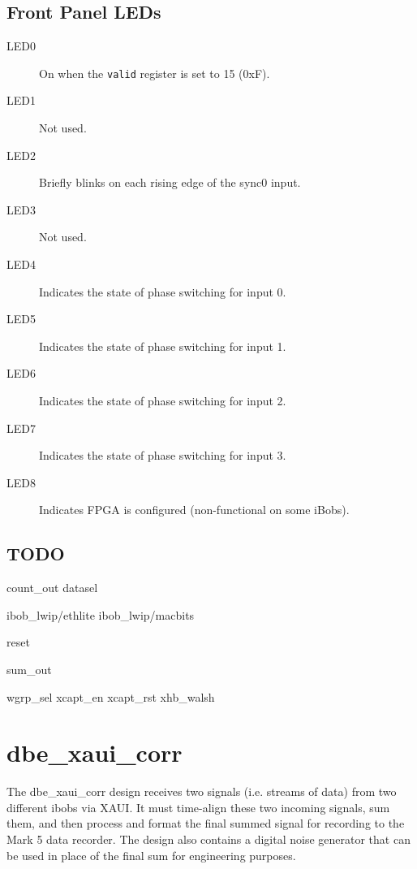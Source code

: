 \documentclass[12pt]{article}
\begin{document}
  \subsection{Front Panel LEDs}
\begin{description}
\item[LED0] On when the \verb|valid| register is set to 15 (0xF).
\item[LED1] Not used.
\item[LED2] Briefly blinks on each rising edge of the sync0 input.
\item[LED3] Not used.
\item[LED4] Indicates the state of  phase switching for input 0.
\item[LED5] Indicates the state of  phase switching for input 1.
\item[LED6] Indicates the state of  phase switching for input 2.
\item[LED7] Indicates the state of  phase switching for input 3.
\item[LED8] Indicates FPGA is configured (non-functional on some iBobs).
\end{description}

  \subsection{TODO}
count\_out
datasel

\begin{description}
\filbreak
{}
\end{description}

ibob\_lwip/ethlite
ibob\_lwip/macbits

reset

sum\_out

\begin{description}
\filbreak
{}
\end{description}

wgrp\_sel
xcapt\_en
xcapt\_rst
xhb\_walsh

\section{dbe\_xaui\_corr}

The dbe\_xaui\_corr design receives two signals (i.e. streams of data) from two
different ibobs via XAUI.  It must time-align these two incoming signals, sum
them, and then process and format the final summed signal for recording to the
Mark 5 data recorder.  The design also contains a digital noise generator that
can be used in place of the final sum for engineering purposes.
\end{document}
